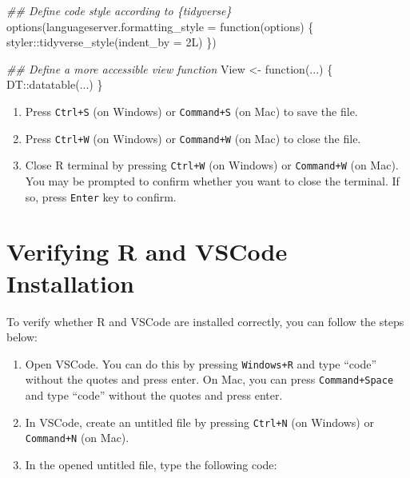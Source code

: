\documentclass[
  letterpaper,
  DIV=11,
  numbers=noendperiod]{scrartcl}
\newenvironment{Shaded}{\begin{snugshade}}{\end{snugshade}}
\newcommand{\AttributeTok}[1]{\textcolor[rgb]{0.40,0.45,0.13}{#1}}
\newcommand{\ControlFlowTok}[1]{\textcolor[rgb]{0.00,0.23,0.31}{#1}}
\newcommand{\DecValTok}[1]{\textcolor[rgb]{0.68,0.00,0.00}{#1}}
\newcommand{\DocumentationTok}[1]{\textcolor[rgb]{0.37,0.37,0.37}{\textit{#1}}}
\newcommand{\FunctionTok}[1]{\textcolor[rgb]{0.28,0.35,0.67}{#1}}
\newcommand{\NormalTok}[1]{\textcolor[rgb]{0.00,0.23,0.31}{#1}}
\newcommand{\OtherTok}[1]{\textcolor[rgb]{0.00,0.23,0.31}{#1}}
\newcommand{\SpecialCharTok}[1]{\textcolor[rgb]{0.37,0.37,0.37}{#1}}
\begin{document}
\begin{Shaded}
\begin{Highlighting}[]
\DocumentationTok{\#\# Define code style according to \{tidyverse\}}
\FunctionTok{options}\NormalTok{(}\AttributeTok{languageserver.formatting\_style =} \ControlFlowTok{function}\NormalTok{(options) \{}
\NormalTok{  styler}\SpecialCharTok{::}\FunctionTok{tidyverse\_style}\NormalTok{(}\AttributeTok{indent\_by =} \DecValTok{2}\NormalTok{L)}
\NormalTok{\})}

\DocumentationTok{\#\# Define a more accessible view function}
\NormalTok{View }\OtherTok{\textless{}{-}} \ControlFlowTok{function}\NormalTok{(...) \{}
\NormalTok{  DT}\SpecialCharTok{::}\FunctionTok{datatable}\NormalTok{(...)}
\NormalTok{\}}
\end{Highlighting}
\end{Shaded}

\begin{enumerate}
\def\labelenumi{\arabic{enumi}.}
\setcounter{enumi}{6}
\item
  Press \texttt{Ctrl+S} (on Windows) or \texttt{Command+S} (on Mac) to
  save the file.
\item
  Press \texttt{Ctrl+W} (on Windows) or \texttt{Command+W} (on Mac) to
  close the file.
\item
  Close R terminal by pressing \texttt{Ctrl+W} (on Windows) or
  \texttt{Command+W} (on Mac). You may be prompted to confirm whether
  you want to close the terminal. If so, press \texttt{Enter} key to
  confirm.
\end{enumerate}

\hypertarget{sec-confirm-installation}{%
\section{Verifying R and VSCode
Installation}\label{sec-confirm-installation}}

To verify whether R and VSCode are installed correctly, you can follow
the steps below:

\begin{enumerate}
\def\labelenumi{\arabic{enumi}.}
\item
  Open VSCode. You can do this by pressing \texttt{Windows+R} and type
  ``code'' without the quotes and press enter. On Mac, you can press
  \texttt{Command+Space} and type ``code'' without the quotes and press
  enter.
\item
  In VSCode, create an untitled file by pressing \texttt{Ctrl+N} (on
  Windows) or \texttt{Command+N} (on Mac).
\item
  In the opened untitled file, type the following code:
\end{enumerate}
\end{document}
